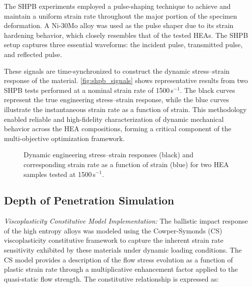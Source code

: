 The SHPB experiments employed a pulse-shaping technique to achieve and maintain a uniform strain rate throughout the major portion of the specimen deformation. A Ni-30Mo alloy was used as the pulse shaper due to its strain hardening behavior, which closely resembles that of the tested HEAs. The SHPB setup captures three essential waveforms: the incident pulse, transmitted pulse, and reflected pulse. %

These signals are time-synchronized to construct the dynamic stress–strain response of the material. \autoref{fig:shpb_signals} shows representative results from two SHPB tests performed at a nominal strain rate of 1500\,s$^{-1}$. The black curves represent the true engineering stress–strain response, while the blue curves illustrate the instantaneous strain rate as a function of strain. This methodology enabled reliable and high-fidelity characterization of dynamic mechanical behavior across the HEA compositions, forming a critical component of the multi-objective optimization framework.

\begin{figure}[H]
    \centering
    
    \caption{Dynamic engineering stress–strain responses (black) and corresponding strain rate as a function of strain (blue) for two HEA samples tested at 1500\,s$^{-1}$.}
    \label{fig:shpb_signals}
\end{figure}



\subsection{Depth of Penetration Simulation}

\emph{Viscoplasticity Constitutive Model Implementation:} The ballistic impact response of the high entropy alloys was modeled using the Cowper-Symonds (CS) viscoplasticity constitutive framework to capture the inherent strain rate sensitivity exhibited by these materials under dynamic loading conditions. The CS model provides a description of the flow stress evolution as a function of plastic strain rate through a multiplicative enhancement factor applied to the quasi-static flow strength. The constitutive relationship is expressed as:

